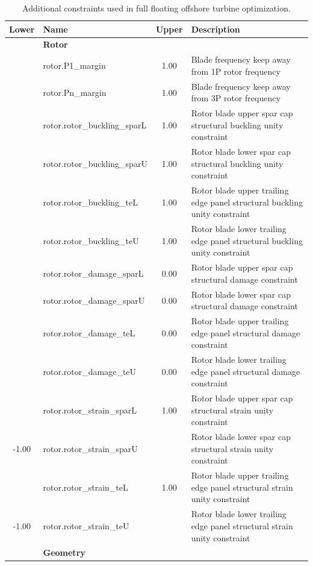 \begin{table}[htbp] \begin{center}
    \caption{Additional constraints used in full floating offshore
      turbine optimization.}
    \label{tbl:constraints-turb}
    {\footnotesize
  \begin{tabular}{ c l c l} \hline
    \textbf{Lower} & \textbf{Name} & \textbf{Upper} & \textbf{Description}\\
\hline \hline
    & \textbf{Rotor} &  &\\
 & rotor.P1\_margin & 1.00 & Blade frequency keep away from 1P rotor frequency\\
 & rotor.Pn\_margin & 1.00 & Blade frequency keep away from 3P rotor frequency\\
 & rotor.rotor\_buckling\_sparL & 1.00 & Rotor blade upper spar cap structural buckling unity constraint\\
 & rotor.rotor\_buckling\_sparU & 1.00 & Rotor blade lower spar cap structural buckling unity constraint\\
 & rotor.rotor\_buckling\_teL & 1.00 & Rotor blade upper trailing edge panel structural buckling unity constraint\\
 & rotor.rotor\_buckling\_teU & 1.00 & Rotor blade lower trailing edge panel structural buckling unity constraint\\
 & rotor.rotor\_damage\_sparL & 0.00 & Rotor blade upper spar cap structural damage constraint\\
 & rotor.rotor\_damage\_sparU & 0.00 & Rotor blade lower spar cap structural damage constraint\\
 & rotor.rotor\_damage\_teL & 0.00 & Rotor blade upper trailing edge panel structural damage constraint\\
 & rotor.rotor\_damage\_teU & 0.00 & Rotor blade lower trailing edge panel structural damage constraint\\
 & rotor.rotor\_strain\_sparL & 1.00 & Rotor blade upper spar cap structural strain unity constraint\\
  -1.00 & rotor.rotor\_strain\_sparU &  & Rotor blade lower spar cap structural strain unity constraint\\
 & rotor.rotor\_strain\_teL & 1.00 & Rotor blade upper trailing edge panel structural strain unity constraint\\
  -1.00 & rotor.rotor\_strain\_teU &  & Rotor blade lower trailing edge panel structural strain unity constraint\\
 & \textbf{Geometry} &  & \\

\end{tabular}}
\end{center}
\end{table}
